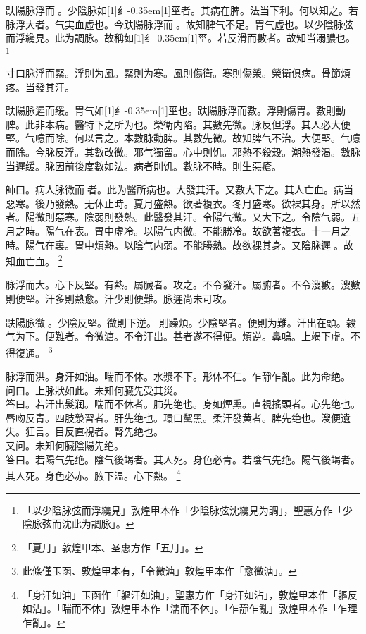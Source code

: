 \documentclass[11pt,oneside,b5paper]{ctexbook}
\begin{document}
\begin{flushleft}
趺陽脉浮而{𬈧}。少陰脉如{\hbox{\scalebox{0.68}[1]{纟}\kern-0.35em\scalebox{0.64}[1]{巠}}}者。其病在脾。法当下利。何以知之。若脉浮大者。气実血虛也。今趺陽脉浮而{𬈧}。故知脾气不足。胃气虛也。以少陰脉弦而浮纔見。此为調脉。故稱如{\hbox{\scalebox{0.68}[1]{纟}\kern-0.35em\scalebox{0.64}[1]{巠}}}。若反滑而數者。故知当溺膿也。
\footnote{「以少陰脉弦而浮纔見」敦煌甲本作「少陰脉弦沈纔見为調」，聖惠方作「少陰脉弦而沈此为調脉」。}

寸口脉浮而緊。浮則为風。緊則为寒。風則傷衛。寒則傷榮。榮衛俱病。骨節煩疼。当發其汗。

趺陽脉遲而缓。胃气如{\hbox{\scalebox{0.68}[1]{纟}\kern-0.35em\scalebox{0.64}[1]{巠}}}也。趺陽脉浮而數。浮則傷胃。數則動脾。此非本病。醫特下之所为也。榮衛内陷。其數先微。脉反但浮。其人必大便堅。气噫而除。何以言之。本數脉動脾。其數先微。故知脾气不治。大便堅。气噫而除。今脉反浮。其數改微。邪气獨留。心中則饥。邪熱不殺穀。潮熱發渴。數脉当遲缓。脉因前後度數如法。病者則饥。數脉不時。則生惡瘡。

師曰。病人脉微而{𬈧}者。此为醫所病也。大發其汗。又數大下之。其人亡血。病当惡寒。後乃發熱。无休止時。夏月盛熱。欲著複衣。冬月盛寒。欲裸其身。所以然者。陽微則惡寒。陰弱則發熱。此醫發其汗。令陽气微。又大下之。令陰气弱。五月之時。陽气在表。胃中虛冷。以陽气内微。不能勝冷。故欲著複衣。十一月之時。陽气在裏。胃中煩熱。以陰气内弱。不能勝熱。故欲裸其身。又陰脉遲{𬈧}。故知血亡血。
\footnote{「夏月」敦煌甲本、圣惠方作「五月」。}

脉浮而大。心下反堅。有熱。屬臓者。攻之。不令發汗。屬腑者。不令溲數。溲數則便堅。汗多則熱愈。汗少則便難。脉遲尚未可攻。

趺陽脉微{𬈧}。少陰反堅。微則下逆。{𬈧}則躁煩。少陰堅者。便則为難。汗出在頭。穀气为下。便難者。令微溏。不令汗出。甚者遂不得便。煩逆。鼻鳴。上竭下虛。不得復通。
\footnote{此條僅玉函、敦煌甲本有，「令微溏」敦煌甲本作「愈微溏」。}

脉浮而洪。身汗如油。喘而不休。水漿不下。形体不仁。乍靜乍亂。此为命绝。\\
问曰。上脉狀如此。未知何臓先受其災。\\
答曰。若汗出髮润。喘而不休者。肺先绝也。身如煙熏。直視搖頭者。心先绝也。唇吻反青。四肢漐習者。肝先绝也。環口黧黑。柔汗發黄者。脾先绝也。溲便遺失。狂言。目反直視者。腎先绝也。\\
又问。未知何臓陰陽先绝。\\
答曰。若陽气先绝。陰气後竭者。其人死。身色必青。若陰气先绝。陽气後竭者。其人死。身色必赤。腋下温。心下熱。
\footnote{「身汗如油」玉函作「軀汗如油」，聖惠方作「身汗如沾」，敦煌甲本作「軀反如沾」。「喘而不休」敦煌甲本作「濡而不休」。「乍靜乍亂」敦煌甲本作「乍理乍亂」。}


\end{flushleft}
\end{document}

